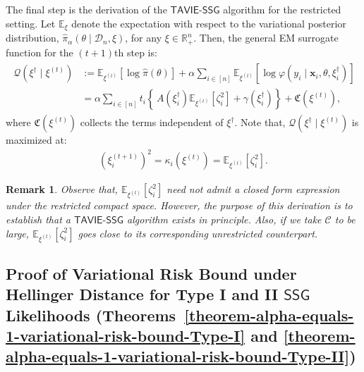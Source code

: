 \documentclass[12pt]{article}
\newtheorem{remark}{Remark}[section]
\numberwithin{equation}{section}
\newcommand{\tssg}{\mathsf{TAVIE}\text{-}\mathsf{SSG}}
\begin{document}
The final step is the derivation of the $\tssg$ algorithm for the {restricted} setting. Let $\mathbb{E}_{\xi}$ denote the expectation with respect to the variational posterior distribution, $\widehat{\pi}_{\alpha}(\theta \mid \mathcal{D}_n, \xi)$, for any $\xi \in \mathbb{R}^n_{+}$. Then, the general EM surrogate function for the $(t+1)$th step is:
% 
\begin{align}\label{eq:compact-restriction-4}
\begin{split}
\mathcal{Q}(\xi^{\dagger} \mid \xi^{(t)}) 
&:= \mathbb{E}_{\xi^{(t)}} \left[\log \widehat{\pi}(\theta)\right] + \alpha \sum_{i\in[n]} \mathbb{E}_{\xi^{(t)}} \left[\log \varphi(y_i \mid \mathbf{x}_i, \theta, \xi^{\dagger}_i) \right]\\
&= \alpha \sum_{i\in[n]} t_i\left\{\,A(\xi_i^{\dagger}) \mathbb{E}_{\xi^{(t)}} \left[\zeta_i^2\right] + \gamma(\xi_i^{\dagger})\right\} + \mathfrak{C}(\xi^{(t)}),
\end{split}
\end{align}
%
where $\mathfrak{C}(\xi^{(t)})$ collects the terms independent of $\xi^{\dagger}$. Note that, $\mathcal{Q}(\xi^{\dagger} \mid \xi^{(t)})$ is maximized at:
%
\begin{align}
\label{eq:compact-restriction-5}
(\xi_i^{(t+1)})^2 = \kappa_i(\xi^{(t)}) = \mathbb{E}_{\xi^{(t)}}\left[\zeta_i^2\right]. 
\end{align}
%
\begin{remark}
Observe that, $\mathbb{E}_{\xi^{(t)}}\left[\zeta_i^2\right]$ need not admit a closed form expression under the {restricted} compact space. However, the purpose of this derivation is to establish that a $\tssg$ algorithm exists in principle. Also, if we take $\mathcal{C}$ to be large, $\mathbb{E}_{\xi^{(t)}}\left[\zeta_i^2\right]$ goes close to its corresponding unrestricted counterpart.
\end{remark}

\subsection{Proof of Variational Risk Bound under Hellinger Distance for Type I and II \texorpdfstring{$\mathsf{SSG}$}{SSG} Likelihoods (\texorpdfstring{Theorems~\ref{theorem-alpha-equals-1-variational-risk-bound-Type-I}}{Theorems 5} and \texorpdfstring{\ref{theorem-alpha-equals-1-variational-risk-bound-Type-II}}{6})}\label{app:proof-theorem-vb-hellinger-type-1-2}
\end{document}
